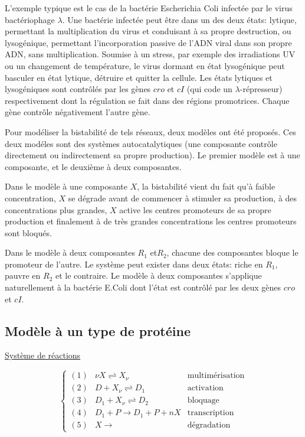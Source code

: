 \documentclass{article}
\def\magenta{\color{goldenrod}}
\begin{document}
L'exemple typique est le cas de la bact{\'e}rie Escherichia Coli infect{\'e}e par le
virus bact{\'e}riophage $\lambda$. Une bact{\'e}rie infect{\'e}e peut {\^e}tre dans un des
deux {\'e}tats: lytique, permettant la multiplication du virus et conduisant {\`a} sa
propre destruction, ou lysog{\'e}nique, permettant l'incorporation passive de
l'ADN viral dans son propre ADN, sans multiplication. Soumise {\`a} un stress, par
exemple des irradiations UV ou un changement de temp{\'e}rature, le virus dormant
en {\'e}tat lysog{\'e}nique peut basculer en {\'e}tat lytique, d{\'e}truire et quitter la
cellule. Les {\'e}tats lytiques et lysog{\'e}niques sont contr{\^o}l{\'e}s par les g{\`e}nes
$cro$ et $cI$ (qui code un $\lambda$-r{\'e}presseur) respectivement dont la
r{\'e}gulation se fait dans des r{\'e}gions promotrices. Chaque g{\`e}ne contr{\^o}le
n{\'e}gativement l'autre g{\`e}ne.

Pour mod{\'e}liser la bistabilit{\'e} de tels r{\'e}seaux, deux mod{\`e}les ont {\'e}t{\'e} propos{\'e}s.
Ces deux mod{\'e}les sont des syst{\`e}mes autocatalytiques
(une composante  contr{\^o}le directement ou indirectement sa propre production).
Le premier mod{\`e}le est {\`a} une composante, et le deuxi{\`e}me {\`a} deux composantes.

Dans le mod{\`e}le {\`a} une composante $X$, la bistabilit{\'e} vient du fait qu'{\`a} faible
concentration, $X$ se d{\'e}grade avant de commencer {\`a} stimuler sa production, {\`a} des
concentrations plus grandes, $X$ active les centres promoteurs de sa propre
production et
finalement {\`a} de tr{\`e}s grandes concentrations les centres promoteurs sont bloqu{\'e}s.

Dans le mod{\`e}le {\`a} deux composantes $R_1$ et$R_2$, chacune des composantes bloque le
promoteur de l'autre. Le syst{\`e}me peut exister dans deux {\'e}tats:
riche en $R_1$, pauvre en $R_2$ et le contraire. Le mod{\`e}le {\`a} deux composantes
s'applique naturellement {\`a} la bact{\'e}rie E.Coli dont l'{\'e}tat est contr{\^o}l{\'e} par les
deux g{\`e}nes $cro$ et $cI$.

\subsection{\magenta \textsf{\Large
Mod{\`e}le {\`a} un type de prot{\'e}ine}}


\underline{Syst{\`e}me de r{\'e}actions}


\begin{equation}\label{eq:A}
  \left \{
 \begin{array}{lll}
(1) &  \nu X \rightleftharpoons X_\nu   & \textrm{multim{\'e}risation} \\
 (2)  & D+X_\nu  \rightleftharpoons D_1 &       \textrm{activation} \\
(3)  & D_1+X_\nu \rightleftharpoons D_2 & \textrm{bloquage} \\
(4) & D_1+P \to D_1+P+nX        & \textrm{transcription} \\
(5) & X \rightarrow    &  \textrm{d{\'e}gradation}
\end{array} \right.
\end{equation}
\end{document}
